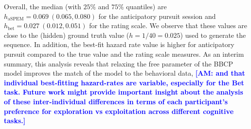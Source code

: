 \documentclass[10pt,letterpaper]{article}
\newcommand{\citep}[1]{\cite{#1}}
\newcommand{\LP}[1]{\textbf{\textcolor{red}{[LP: #1]}}}
\newcommand{\AM}[1]{\textbf{\textcolor{blue}{[AM: #1]}}}
\newcommand{\CP}[1]{\textbf{\textcolor{green}{[CP: #1]}}}
\begin{document}
Overall, the median (with $25\%$ and $75\%$ quantiles) are $h_{\text{aSPEM}} = 0.069 ~ (0.065, 0.080)$ %
for the anticipatory pursuit session and
$h_{\text{bet}} = 0.027 ~ (0.012, 0.051)$ %
for the rating scale.
We observe that these values are close to the (hidden) ground truth value ($h=1/40=0.025$) used to generate the sequence.
In addition, the best-fit hazard rate value is higher for anticipatory pursuit compared to the true value and the rating scale measures.
As an interim summary, this analysis reveals
that relaxing the free parameter of the BBCP model
improves the match of the model to the behavioral data, \AM{and that individual best-fitting hazard-rates are variable, especially for the Bet task.
Future work might provide important insight about the analysis of these inter-individual differences in terms of each participant's preference for exploration vs exploitation across different cognitive tasks.}
\end{document}
